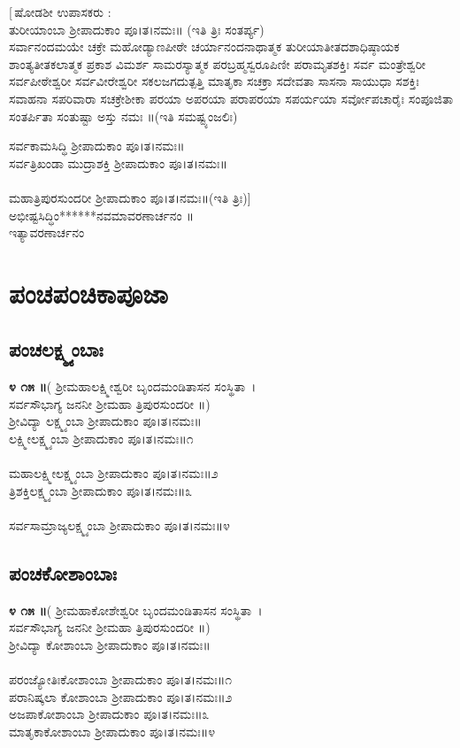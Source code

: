 [\,ಷೋಡಶೀ ಉಪಾಸಕರು :\\
 ತುರೀಯಾಂಬಾ ಶ್ರೀಪಾದುಕಾಂ ಪೂ।ತ।ನಮಃ॥ (ಇತಿ ತ್ರಿಃ ಸಂತರ್ಪ್ಯ)\\
 ಸರ್ವಾನಂದಮಯೇ ಚಕ್ರೇ ಮಹೋಡ್ಯಾಣಪೀಠೇ ಚರ್ಯಾನಂದನಾಥಾತ್ಮಕ ತುರೀಯಾತೀತದಶಾಧಿಷ್ಠಾಯಕ ಶಾಂತ್ಯತೀತಕಲಾತ್ಮಕ ಪ್ರಕಾಶ ವಿಮರ್ಶ ಸಾಮರಸ್ಯಾತ್ಮಕ ಪರಬ್ರಹ್ಮಸ್ವರೂಪಿಣೀ ಪರಾಮೃತಶಕ್ತಿಃ ಸರ್ವ ಮಂತ್ರೇಶ್ವರೀ ಸರ್ವಪೀಠೇಶ್ವರೀ ಸರ್ವವೀರೇಶ್ವರೀ ಸಕಲಜಗದುತ್ಪತ್ತಿ ಮಾತೃಕಾ ಸಚಕ್ರಾ ಸದೇವತಾ ಸಾಸನಾ ಸಾಯುಧಾ ಸಶಕ್ತಿಃ ಸವಾಹನಾ ಸಪರಿವಾರಾ ಸಚಕ್ರೇಶೀಕಾ ಪರಯಾ ಅಪರಯಾ ಪರಾಪರಯಾ ಸಪರ್ಯಯಾ ಸರ್ವೋಪಚಾರೈಃ ಸಂಪೂಜಿತಾ ಸಂತರ್ಪಿತಾ ಸಂತುಷ್ಟಾ ಅಸ್ತು ನಮಃ ॥(ಇತಿ ಸಮಷ್ಟ್ಯಂಜಲಿಃ)

 ಸರ್ವಕಾಮಸಿದ್ಧಿ ಶ್ರೀಪಾದುಕಾಂ ಪೂ।ತ।ನಮಃ॥\\
 ಸರ್ವತ್ರಿಖಂಡಾ ಮುದ್ರಾಶಕ್ತಿ ಶ್ರೀಪಾದುಕಾಂ ಪೂ।ತ।ನಮಃ॥\\
\\
 ಮಹಾತ್ರಿಪುರಸುಂದರೀ ಶ್ರೀಪಾದುಕಾಂ ಪೂ।ತ।ನಮಃ॥(ಇತಿ ತ್ರಿಃ)]\,\\
 ಅಭೀಷ್ಟಸಿದ್ಧಿಂ******ನವಮಾವರಣಾರ್ಚನಂ ॥\\
ಇತ್ಯಾವರಣಾರ್ಚನಂ
\section{ಪಂಚಪಂಚಿಕಾಪೂಜಾ}
\subsection{ಪಂಚಲಕ್ಷ್ಮ್ಯಂಬಾಃ}
{\bfseries ೪ ೧೫ ॥}( ಶ್ರೀಮಹಾಲಕ್ಷ್ಮೀಶ್ವರೀ ಬೃಂದಮಂಡಿತಾಸನ ಸಂಸ್ಥಿತಾ~।\\
ಸರ್ವಸೌಭಾಗ್ಯ ಜನನೀ ಶ್ರೀಮಹಾ ತ್ರಿಪುರಸುಂದರೀ ॥)\\
ಶ್ರೀವಿದ್ಯಾ ಲಕ್ಷ್ಮ್ಯಂಬಾ ಶ್ರೀಪಾದುಕಾಂ ಪೂ।ತ।ನಮಃ॥\\
ಲಕ್ಷ್ಮೀಲಕ್ಷ್ಮ್ಯಂಬಾ ಶ್ರೀಪಾದುಕಾಂ ಪೂ।ತ।ನಮಃ॥೧\\
\\ಮಹಾಲಕ್ಷ್ಮೀಲಕ್ಷ್ಮ್ಯಂಬಾ ಶ್ರೀಪಾದುಕಾಂ ಪೂ।ತ।ನಮಃ॥೨\\
ತ್ರಿಶಕ್ತಿಲಕ್ಷ್ಮ್ಯಂಬಾ ಶ್ರೀಪಾದುಕಾಂ ಪೂ।ತ।ನಮಃ॥೩\\
 \\ಸರ್ವಸಾಮ್ರಾಜ್ಯಲಕ್ಷ್ಮ್ಯಂಬಾ ಶ್ರೀಪಾದುಕಾಂ ಪೂ।ತ।ನಮಃ॥೪
\subsection{ಪಂಚಕೋಶಾಂಬಾಃ}
{\bfseries ೪ ೧೫ ॥}( ಶ್ರೀಮಹಾಕೋಶೇಶ್ವರೀ ಬೃಂದಮಂಡಿತಾಸನ ಸಂಸ್ಥಿತಾ~।\\
ಸರ್ವಸೌಭಾಗ್ಯ ಜನನೀ ಶ್ರೀಮಹಾ ತ್ರಿಪುರಸುಂದರೀ ॥)\\
ಶ್ರೀವಿದ್ಯಾ ಕೋಶಾಂಬಾ ಶ್ರೀಪಾದುಕಾಂ ಪೂ।ತ।ನಮಃ॥\\
\\ ಪರಂಜ್ಯೋತಿಃಕೋಶಾಂಬಾ ಶ್ರೀಪಾದುಕಾಂ ಪೂ।ತ।ನಮಃ॥೧\\
 ಪರಾನಿಷ್ಕಲಾ ಕೋಶಾಂಬಾ ಶ್ರೀಪಾದುಕಾಂ ಪೂ।ತ।ನಮಃ॥೨\\
ಅಜಪಾಕೋಶಾಂಬಾ ಶ್ರೀಪಾದುಕಾಂ ಪೂ।ತ।ನಮಃ॥೩\\
 ಮಾತೃಕಾಕೋಶಾಂಬಾ ಶ್ರೀಪಾದುಕಾಂ ಪೂ।ತ।ನಮಃ॥೪
